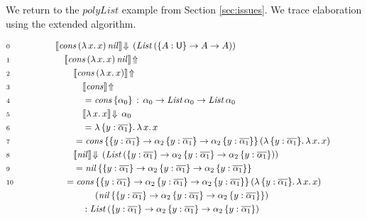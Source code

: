 \documentclass[acmsmall,review,anonymous,prologue,dvipsnames]{acmart}\settopmatter{printfolios=true,printccs=false,printacmref=false}
\renewcommand{\U}{\mathsf{U}}
\newcommand{\mi}[1]{\mathit{#1}}
\newcommand{\echeckt}[2]{\llbracket#1\rrbracket\!\Downarrow\,#2}
\newcommand{\einfert}[1]{\llbracket#1\rrbracket\!\Uparrow}
\newcommand{\ol}[1]{\overline{#1}}
\theoremstyle{remark}
\begin{document}
\begin{example}
We return to the $\mi{polyList}$ example from Section \ref{sec:issues}. We trace
elaboration using the extended algorithm.

\begin{alignat*}{3}
  & \scriptstyle{0 }\qquad\qquad && \echeckt{\mi{cons}\,(\lambda\,x.\,x)\,\mi{nil}}{(\mi{List}\,(\{A : \U\}\to A \to A))}
      \hspace{14em}\\
  & \scriptstyle{1 }  && \quad \einfert{\mi{cons}\,(\lambda\,x.\,x)\,\mi{nil}} \\
  & \scriptstyle{2 }  && \qquad \einfert{\mi{cons}\,(\lambda\,x.\,x)} \\
  & \scriptstyle{3 }  && \qquad\quad \einfert{\mi{cons}}\\
  & \scriptstyle{4 }  && \qquad\quad = \mi{cons}\,\{\alpha_0\}\,:\,\alpha_0 \to \mi{List}\,\alpha_0 \to \mi{List}\,\alpha_0\\
  & \scriptstyle{5 }  && \qquad\quad \echeckt{\lambda\,x.\,x}{\alpha_0}\\
  & \scriptstyle{6 }  && \qquad\quad = \lambda\,\{y : \ol{\alpha_1}\}.\,\lambda\,x.\,x\\
  & \scriptstyle{7 }  && \qquad = \mi{cons}\,
                       \{\{y : \ol{\alpha_1}\} \to \alpha_2\,\{y : \ol{\alpha_1}\}\to \alpha_2\,\{y : \ol{\alpha_1}\}\}\,
                       (\lambda\,\{y : \ol{\alpha_1}\}.\,\lambda\,x.\,x)\\
  & \scriptstyle{8 }  && \qquad \echeckt{\mi{nil}}{(\mi{List}\,(\{y : \ol{\alpha_1}\} \to \alpha_2\,\{y : \ol{\alpha_1}\}\to \alpha_2\,\{y : \ol{\alpha_1}\}))}\\
  & \scriptstyle{9 }  && \qquad = \mi{nil}\,\{\{y : \ol{\alpha_1}\} \to \alpha_2\,\{y : \ol{\alpha_1}\}\to \alpha_2\,\{y : \ol{\alpha_1}\}\}\\
                       & \scriptstyle{10} && \quad = \mi{cons}\,\{\{y : \ol{\alpha_1}\} \to \alpha_2\,\{y : \ol{\alpha_1}\}\to \alpha_2\,\{y : \ol{\alpha_1}\}\}\,(\lambda\,\{y : \ol{\alpha_1}\}.\,\lambda\,x.\,x)\,\\
                       & && \hspace{4.4em} (\mi{nil}\,\{\{y : \ol{\alpha_1}\} \to \alpha_2\,\{y : \ol{\alpha_1}\}\to \alpha_2\,\{y : \ol{\alpha_1}\}\})\\
  & && \hspace{3em} : \mi{List}\,(\{y : \ol{\alpha_1}\} \to \alpha_2\,\{y : \ol{\alpha_1}\}\to \alpha_2\,\{y : \ol{\alpha_1}\})\\

\end{alignat*}
\end{example}
\end{document}
